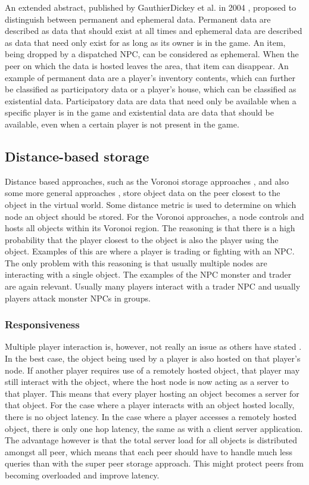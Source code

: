 \documentclass[10pt,a4paper,journal,cspaper,compsoc]{IEEEtran}
\begin{document}
An extended abstract, published by GauthierDickey et al. in 2004 \cite{hybrid_storage1}, proposed to distinguish between permanent and ephemeral
data. Permanent data are described as data that should exist at all times and ephemeral data are described as data that need only exist for as long
as its owner is in the game. An item, being dropped by a dispatched NPC, can be considered as ephemeral. When the peer on which the data is hosted
leaves the area, that item can disappear. An example of permanent data are a player's inventory contents, which can further be classified as
participatory data or a player's house, which can be classified as existential data. Participatory data are data that need only be available when a
specific player is in the game and existential data are data that should be available, even when a certain player is not present in the game.

\subsection{Distance-based storage}
\label{distance_based_storage}

Distance based approaches, such as the Voronoi storage approaches \cite{Buyukkaya_voronoi_state_management}, \cite{Hu_voronoi_IM} and also some more
general approaches \cite{colyseus_distance_based}, store object data on the peer closest to the object in the virtual world. Some distance metric is
used to determine on which node an object should be stored. For the Voronoi approaches, a node controls and hosts all objects within its Voronoi
region. The reasoning is that there is a high probability that the player closest to the object is also the player using the object. Examples of this
are where a player is trading or fighting with an NPC. The only problem with this reasoning is that usually multiple nodes are interacting with a
single object. The examples of the NPC monster and trader are again relevant. Usually many players interact with a trader NPC and usually players
attack monster NPCs in groups.

\subsubsection{Responsiveness}
Multiple player interaction is, however, not really an issue as others have stated \cite{Fan_deisgn_issues_p2p}. In the best case, the object being
used by a player is also hosted on that player's node. If another player requires use of a remotely hosted object, that player may still interact
with the object, where the host node is now acting as a server to that player. This means that every player hosting an object becomes a server for
that object. For the case where a player interacts with an object hosted locally, there is no object latency. In the case where a player accesses a
remotely hosted object, there is only one hop latency, the same as with a client server application. The advantage however is that the total server
load for all objects is distributed amongst all peer, which means that each peer should have to handle much less queries than with the super peer
storage approach. This might protect peers from becoming overloaded and improve latency.
\end{document}
